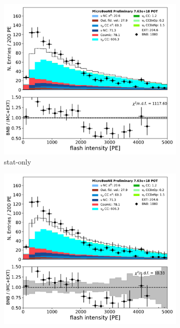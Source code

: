 \documentclass[a4paper]{article}
\begin{document}
\begin{figure}[H] 
\begin{center}
    \begin{subfigure}[b]{0.3\textwidth}
    \centering
    \includegraphics[width=1.00\textwidth]{detsys/datamc/flash_pe_03292020_run3_statonly.pdf}
    \caption{\label{fig:detsys:datamc:flashpe:run3:stat} stat-only}
    \end{subfigure}
    \begin{subfigure}[b]{0.3\textwidth}
    \centering
    \includegraphics[width=1.00\textwidth]{detsys/datamc/flash_pe_03292020_run3_detsys.pdf}

\end{subfigure}
\end{center}
\end{figure}
\end{document}
